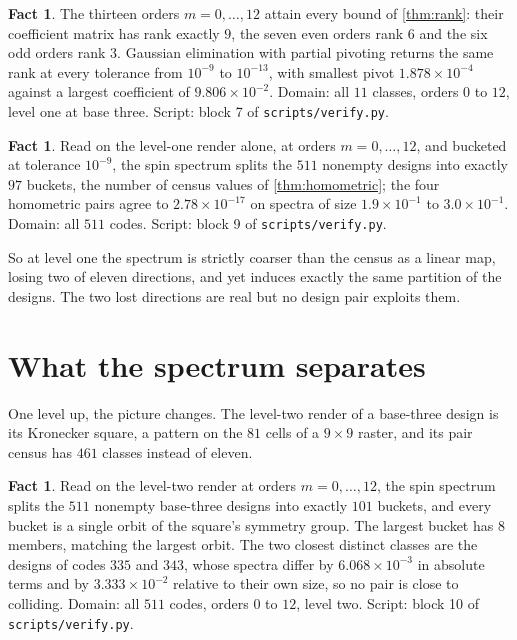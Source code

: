 \documentclass[11pt]{amsart}
\theoremstyle{definition}
\newtheorem{fact}[theorem]{Fact}
\theoremstyle{remark}
\begin{document}
\begin{fact}
\label{fact:rank}
The thirteen orders $m = 0, \dots, 12$ attain every bound of \cref{thm:rank}: their coefficient matrix has rank exactly $9$, the seven even orders rank $6$ and the six odd orders rank $3$. Gaussian elimination with partial pivoting returns the same rank at every tolerance from $10^{-9}$ to $10^{-13}$, with smallest pivot $1.878 \times 10^{-4}$ against a largest coefficient of $9.806 \times 10^{-2}$. Domain: all $11$ classes, orders $0$ to $12$, level one at base three. Script: block 7 of \texttt{scripts/verify.py}.
\end{fact}

\begin{fact}
\label{fact:97}
Read on the level-one render alone, at orders $m = 0, \dots, 12$, and bucketed at tolerance $10^{-9}$, the spin spectrum splits the $511$ nonempty designs into exactly $97$ buckets, the number of census values of \cref{thm:homometric}; the four homometric pairs agree to $2.78\times10^{-17}$ on spectra of size $1.9\times10^{-1}$ to $3.0\times10^{-1}$. Domain: all $511$ codes. Script: block 9 of \texttt{scripts/verify.py}.
\end{fact}

So at level one the spectrum is strictly coarser than the census as a linear map, losing two of eleven directions, and yet induces exactly the same partition of the designs. The two lost directions are real but no design pair exploits them.

\section{What the spectrum separates}
\label{sec:separation}

One level up, the picture changes. The level-two render of a base-three design is its Kronecker square, a pattern on the $81$ cells of a $9 \times 9$ raster, and its pair census has $461$ classes instead of eleven.

\begin{fact}
\label{fact:levels}
Read on the level-two render at orders $m = 0, \dots, 12$, the spin spectrum splits the $511$ nonempty base-three designs into exactly $101$ buckets, and every bucket is a single orbit of the square's symmetry group. The largest bucket has $8$ members, matching the largest orbit. The two closest distinct classes are the designs of codes $335$ and $343$, whose spectra differ by $6.068 \times 10^{-3}$ in absolute terms and by $3.333 \times 10^{-2}$ relative to their own size, so no pair is close to colliding. Domain: all $511$ codes, orders $0$ to $12$, level two. Script: block 10 of \texttt{scripts/verify.py}.
\end{fact}
\end{document}
